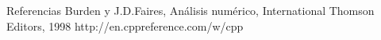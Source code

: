 \begin{section}{Referencias}
	Burden y J.D.Faires, Análisis numérico, International Thomson Editors, 1998
	http://en.cppreference.com/w/cpp
\end{section}
